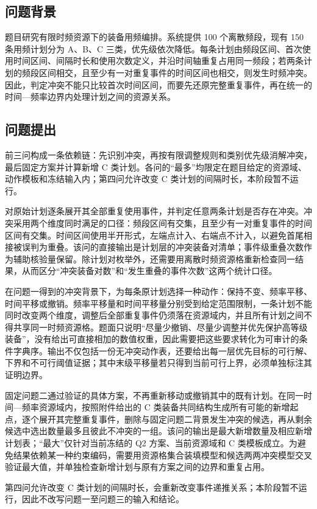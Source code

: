 \subsection{问题背景}

题目研究有限时频资源下的装备用频编排。系统提供 100 个离散频段，现有 150 条用频计划分为 A、B、C 三类，优先级依次降低。每条计划由频段区间、首次使用时间区间、间隔时长和使用次数定义，并沿时间轴重复占用同一频段；若两条计划的频段区间相交，且至少有一对重复事件的时间区间也相交，则发生时频冲突。因此，判定冲突不能只比较首次时间区间，而要先还原完整重复事件，再在统一的时间—频率边界内处理计划之间的资源关系。

\subsection{问题提出}

前三问构成一条依赖链：先识别冲突，再按有限调整规则和类别优先级消解冲突，最后固定方案并计算新增 C 类计划。各问的“最多”均限定在题目给定的资源域、动作模板和冻结输入内；第四问允许改变 C 类计划的间隔时长，本阶段暂不运行。

对原始计划逐条展开其全部重复使用事件，并判定任意两条计划是否存在冲突。冲突采用两个维度同时满足的口径：频段区间有交集，且至少有一对重复事件的时间区间有交集。时间区间使用半开形式，左端点计入、右端点不计入，以避免首尾相接被误判为重叠。该问的直接输出是计划层的冲突装备对清单；事件级重叠次数作为辅助核验量保留。除计划对枚举外，还需要用离散时频资源格重新检查同一结果，从而区分“冲突装备对数”和“发生重叠的事件次数”这两个统计口径。

在问题一得到的冲突背景下，为每条原计划选择一种动作：保持不变、频率平移、时间平移或撤销。频率平移量和时间平移量分别受到给定范围限制，一条计划不能同时改变两个维度，调整后全部重复事件仍须落在资源域内，并且所有计划之间不得共享同一时频资源格。题面只说明“尽量少撤销、尽量少调整并优先保护高等级装备”，没有给出可直接相加的数值权重，因此需要把这些要求转化为可审计的条件字典序。输出不仅包括一份无冲突动作表，还要给出每一层优先目标的可行解、下界和不可行阈值证据；其中末级平移量若只得到当前可行上界，必须单独标注其证明边界。

固定问题二通过验证的具体方案，不再重新移动或撤销其中的既有计划。在同一时间—频率资源域内，按照附件给出的 C 类装备共同结构生成所有可能的新增起点，逐个展开其完整重复事件，删除与固定问题二背景发生冲突的候选，再从剩余候选中选出数量最多且彼此不冲突的一组。该问的输出是最大新增数量及相应新增计划表；“最大”仅针对当前冻结的 Q2 方案、当前资源域和 C 类模板成立。为避免结果依赖某一种约束编码，需要用资源格集合装填模型和候选两两冲突模型交叉验证最大值，并单独检查新增计划与原有方案之间的边界和重复占用。

第四问允许改变 C 类计划的间隔时长，会重新改变事件递推关系；本阶段暂不运行，因此不改写问题一至问题三的输入和结论。
